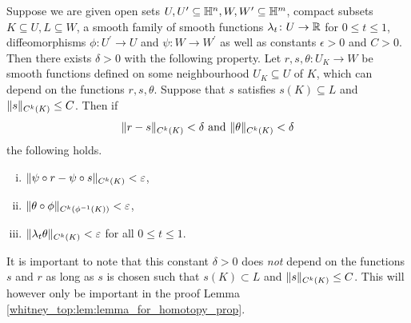 \begin{lemma}
    \label{whitney_top:lem:technical_lemma_about_norms}
    Suppose we are given open sets $U, U^\prime \subseteq \mathbb{H}^n, W, W^\prime \subseteq \mathbb{H}^m$, compact subsets \linebreak $K \subseteq U, L \subseteq W$, a smooth family of smooth functions $\lambda_t \colon U \to \mathbb{R}$ for $0 \leq t \leq 1$, diffeomorphisms $\phi \colon U^\prime \to U$ and $\psi \colon W \to W^\prime$ as well as constants $\epsilon > 0$ and $C > 0$. Then there exists $\delta >0$ with the following property. Let $r,s, \theta \colon U_K \to W$ be smooth functions defined on some neighbourhood $U_K \subseteq U$ of $K$, which can depend on the functions $r,s,\theta$. Suppose that $s$ satisfies $s(K) \subseteq L$ and $\lVert s\rVert_{C^k(K)} \leq C$. Then if
    \[
    \lVert r - s\rVert_{C^k(K)} < \delta \text{ and } \lVert\theta\rVert_{C^k(K)} < \delta
    \]
    the following holds.
    \begin{enumerate}[(i)]
        \item \label{whitney_top:eq:ck_norm_lemma_part1} $\lVert\psi \circ r - \psi \circ s\rVert_{C^k(K)} < \varepsilon$,
        \item \label{whitney_top:eq:ck_norm_lemma_part2} $\lVert\theta \circ \phi\rVert_{C^k(\phi^{-1}(K))} < \varepsilon$,
        \item \label{whitney_top:eq:ck_norm_lemma_part3} $\lVert\lambda_t \theta\rVert_{C^k(K)} < \varepsilon$ for all $0 \leq t \leq 1$.
    \end{enumerate}
\end{lemma}

It is important to note that this constant $\delta > 0$ does \textit{not} depend on the functions $s$ and $r$ as long as $s$ is chosen such that $s(K) \subset L$ and $\lVert s\rVert_{C^k(K)} \leq C$. This will however only be important in the proof Lemma \ref{whitney_top:lem:lemma_for_homotopy_prop}. 

